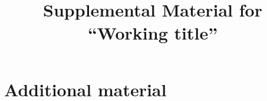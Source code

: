 \documentclass[aps,pre,preprint,superscriptaddress,longbibliography]{revtex4-2}
\begin{document}
\title{Supplemental Material for ``Working title''}

\maketitle

\renewcommand{\thesection}{S\arabic{section}}
\renewcommand{\theequation}{S\arabic{equation}}
\renewcommand{\thefigure}{S\arabic{figure}}
\renewcommand{\thetable}{S\arabic{table}}
\renewcommand{\thetheorem}{S\arabic{theorem}}

\section{Additional material}
\label{sec:additional}

% 
\end{document}
